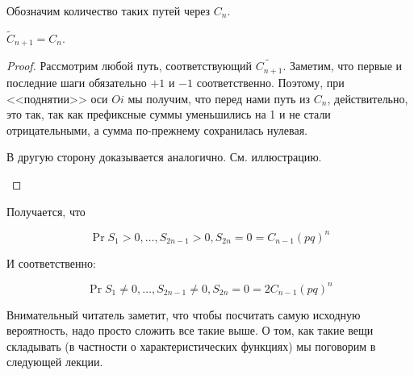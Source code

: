 Обозначим количество таких путей через $C_n$.

\begin{lemma}
  $\tilde{C}_{n + 1} = C_{n}.$
\end{lemma}

\begin{proof}
  Рассмотрим любой путь, соответствующий $\tilde{C_{n + 1}}$. Заметим, что
  первые и последние шаги обязательно $+1$ и $-1$ соответственно. Поэтому, 
  при <<поднятии>> оси $Oi$ мы получим, что перед нами путь из $C_n$, 
  действительно, это так, так как префиксные суммы уменьшились на 1 и не стали отрицательными, а сумма по-прежнему сохранилась нулевая.

  В другую сторону доказывается аналогично. См. иллюстрацию.

  \begin{center}
\end{center}
\end{proof}

Получается, что

\[
  \Pr{S_1 > 0, \ldots, S_{2n - 1} > 0, S_{2n} = 0} = C_{n - 1}(pq)^n
\]

И соответственно:

\[
  \Pr{S_1 \neq 0, \ldots, S_{2n - 1} \neq 0, S_{2n} = 0} = 2C_{n - 1}(pq)^n
\]

Внимательный читатель заметит, что чтобы посчитать самую исходную 
вероятность, надо просто сложить все такие выше. О том, как такие вещи 
складывать (в частности о характеристических функциях) мы поговорим в
следующей лекции.

